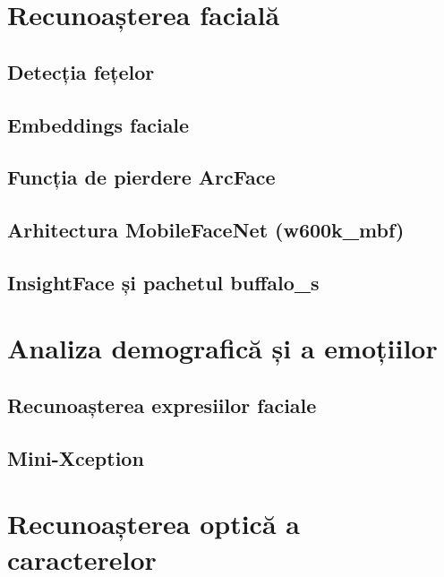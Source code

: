 \documentclass[../../main.tex]{subfiles}
\begin{document}
\section{Recunoașterea facială}
\label{sec:recunoastere_faciala}

\subsection{Detecția fețelor}
\label{subsec:detectie_fete}

\subsection{Embeddings faciale}
\label{subsec:embeddings}

\subsection{Funcția de pierdere ArcFace}
\label{subsec:arcface}

\subsection{Arhitectura MobileFaceNet (w600k\_mbf)}
\label{subsec:mobilefacenet}

\subsection{InsightFace și pachetul buffalo\_s}
\label{subsec:insightface}

\section{Analiza demografică și a emoțiilor}
\label{sec:demografie}

\subsection{Recunoașterea expresiilor faciale}
\label{subsec:fer}

\subsection{Mini-Xception}
\label{subsec:mini_xception}

\section{Recunoașterea optică a caracterelor}
\label{sec:ocr}
\end{document}

